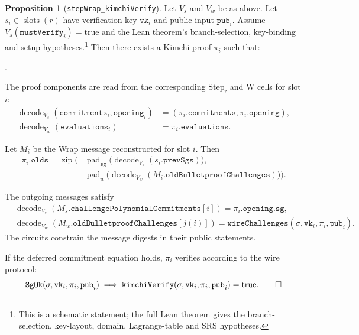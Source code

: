 \documentclass[11pt,a4paper]{article}
\newcommand{\inlinecode}[1]{\mbox{\texttt{#1}}}
\theoremstyle{definition}
\theoremstyle{insetstatement}
\newtheorem{propositiontext}[example]{Proposition}
\newenvironment{statementblock}
  {\begin{list}{}{%
    \setlength{\leftmargin}{0pt}%
    \setlength{\rightmargin}{0pt}%
    \setlength{\labelwidth}{0pt}%
    \setlength{\labelsep}{0pt}%
    \setlength{\itemindent}{0pt}%
    \setlength{\listparindent}{0pt}%
    \setlength{\topsep}{.7\baselineskip plus 2pt minus 1pt}%
    \setlength{\partopsep}{0pt}%
    \setlength{\parsep}{0pt}%
    \setlength{\itemsep}{0pt}}%
    \item\relax}
  {\end{list}}
\newenvironment{proposition}[1][]
  {\begin{statementblock}\begin{propositiontext}[{#1}]\pushQED{\qed}}
  {\popQED\end{propositiontext}\end{statementblock}}
\newcounter{boundarypart}
\newenvironment{boundary}{\begin{list}{\arabic{boundarypart}.}{
  \usecounter{boundarypart}
  \setlength{\leftmargin}{1.6em}
  \setlength{\labelwidth}{1.1em}
  \setlength{\labelsep}{0.5em}
  \setlength{\itemsep}{2pt}
  \setlength{\topsep}{3pt}
  \setlength{\parsep}{0pt}}}{\end{list}}
\begin{document}
\begin{samepage}
\begin{proposition}[\href{https://github.com/l-adic/snarky/blob/main/formal/pickles/Pickles/Soundness/StepWrap.lean\#L406}{\inlinecode{stepWrap\_kimchiVerify}}]
\label{prop:step-wrap-soundness}
Let $V_s$ and $V_w$ be as above. Let $s_i\in\operatorname{slots}(r)$
have verification key $\mathtt{vk}_i$ and public input $\mathtt{pub}_i$.
Assume \mbox{$V_s(\mathtt{mustVerify}_i)=\mathrm{true}$} and the Lean theorem's
branch-selection, key-binding and setup hypotheses.\footnote{This is a
  schematic statement; the \href{https://github.com/l-adic/snarky/blob/main/formal/pickles/Pickles/Soundness/StepWrap.lean\#L406}{full Lean theorem} gives the branch-selection, key-layout, domain,
  Lagrange-table and SRS hypotheses.}
Then there exists a Kimchi proof $\pi_i$ such that:
\begin{boundary}
  \item The proof components are read from the corresponding $\mathrm{Step_r}$
  and $\mathrm{W}$ cells for slot $i$:
    \[
      \begin{aligned}
        \operatorname{decode}_{V_s}(\mathtt{commitments}_i,\mathtt{opening}_i)
          &= (\pi_i.\mathtt{commitments},\pi_i.\mathtt{opening}),\\
        \operatorname{decode}_{V_w}(\mathtt{evaluations}_i)
          &= \pi_i.\mathtt{evaluations}.
      \end{aligned}
    \]
  \item Let $M_i$ be the Wrap message reconstructed for slot $i$. Then
    \[
      \begin{aligned}
        \pi_i.\mathtt{olds} = \operatorname{zip}\bigl(
          &\operatorname{pad}_{\mathtt{sg}}\bigl(
            \operatorname{decode}_{V_s}(s_i.\mathtt{prevSgs})\bigr),\\
          &\operatorname{pad}_{u}\bigl(
            \operatorname{decode}_{V_w}(M_i.\mathtt{oldBulletproofChallenges})\bigr)\bigr).
      \end{aligned}
    \]
  \item The outgoing messages satisfy
    \[
      \begin{aligned}
        &\operatorname{decode}_{V_s}(M_s.\mathtt{challengePolynomialCommitments}[i])
          = \pi_i.\mathtt{opening.sg},\\
        &\operatorname{decode}_{V_w}(M_w.\mathtt{oldBulletproofChallenges}[j(i)])
          = \mathtt{wireChallenges}(\sigma,\mathtt{vk}_i,\pi_i,\mathtt{pub}_i).
      \end{aligned}
    \]
    The circuits constrain the message digests in their public statements.
  \item If the deferred commitment equation holds, $\pi_i$ verifies according to the
  wire protocol:
    \[
      \mathtt{SgOk}(\sigma,\mathtt{vk}_i,\pi_i,\mathtt{pub}_i)
      \;\Longrightarrow\;
      \mathtt{kimchiVerify}(\sigma,\mathtt{vk}_i,\pi_i,\mathtt{pub}_i)
        =\mathrm{true}.\qedhere
    \]
\end{boundary}
\end{proposition}
\end{samepage}
\end{document}

